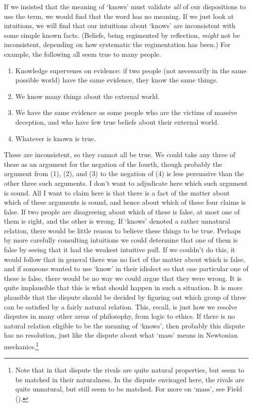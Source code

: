 \documentclass[
  11pt,
  letterpaper,
  DIV=11,
  numbers=noendperiod,
  twoside]{scrartcl}
\providecommand{\tightlist}{%
  \setlength{\itemsep}{0pt}\setlength{\parskip}{0pt}}\usepackage{longtable,booktabs,array}
\begin{document}
If we insisted that the meaning of `knows' must validate \emph{all} of
our dispositions to use the term, we would find that the word has no
meaning. If we just look at intuitions, we will find that our intuitions
about `knows' are inconsistent with some simple known facts. (Beliefs,
being regimented by reflection, \emph{might} not be inconsistent,
depending on how systematic the regimentation has been.) For example,
the following all seem true to many people.

\begin{enumerate}
\def\labelenumi{\arabic{enumi}.}
\tightlist
\item
  Knowledge supervenes on evidence: if two people (not necessarily in
  the same possible world) have the same evidence, they know the same
  things.
\item
  We know many things about the external world.
\item
  We have the same evidence as some people who are the victims of
  massive deception, and who have few true beliefs about their external
  world.
\item
  Whatever is known is true.
\end{enumerate}

These are inconsistent, so they cannot all be true. We could take any
three of these as an argument for the negation of the fourth, though
probably the argument from (1), (2), and (3) to the negation of (4) is
less persuasive than the other three such arguments. I don't want to
adjudicate here which such argument is sound. All I want to claim here
is that there is a fact of the matter about which of these arguments is
sound, and hence about which of these four claims is false. If two
people are disagreeing about which of these is false, at most one of
them is right, and the other is wrong. If `knows' denoted a rather
unnatural relation, there would be little reason to believe these things
to be true. Perhaps by more carefully consulting intuitions we could
determine that one of them is false by seeing that it had the weakest
intuitive pull. If we couldn't do this, it would follow that in general
there was no fact of the matter about which is false, and if someone
wanted to use `know' in their idiolect so that one particular one of
these is false, there would be no way we could argue that they were
wrong. It is quite implausible that this is what should happen in such a
situation. It is more plausible that the dispute should be decided by
figuring out which group of three can be satisfied by a fairly natural
relation. This, recall, is just how we resolve disputes in many other
areas of philosophy, from logic to ethics. If there is no natural
relation eligible to be the meaning of `knows', then probably this
dispute has no resolution, just like the dispute about what `mass' means
in Newtonian mechanics.\footnote{Note that in that dispute the rivals
  are quite natural properties, but seem to be matched in their
  naturalness. In the dispute envisaged here, the rivals are quite
  unnatural, but still seem to be matched. For more on `mass', see Field
  ().}
\end{document}
